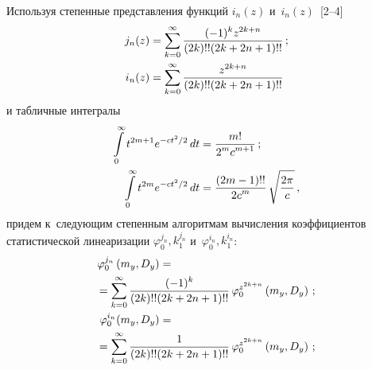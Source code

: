 \begin{multicols}{2}
Используя степенные представления функций $i_n (z)$ и~$i_n (z)$~[2--4]
\begin{align*}
j_n (z) &= \sss_{k=0}^\infty \fr{(-1)^k z^{2k+n}}
    {(2k)!! (2k + 2n + 1)!!}\,; %
    \\
i_n (z)& = \sss_{k=0}^\infty \fr{ z^{2k+n}}{(2k)!! (2k + 2n + 1)!!} %
    \end{align*}
и табличные интегралы
    \begin{align*}
       \displaystyle \int\limits_0^\infty t^{2m+1} e^{-ct^2/2}\, dt &= 
       \displaystyle\frac{\displaystyle m!\mathstrut}{\displaystyle 2^m c^{m+1}\mathstrut}\,; \\
 \displaystyle\int\limits_0^\infty t^{2m} e^{-ct^2/2}\, dt &=  \displaystyle\frac{\displaystyle (2m-1)!!\mathstrut}{\displaystyle 2c^m\mathstrut}\,\sqrt{\displaystyle\frac{\displaystyle 2\pi\mathstrut}{\displaystyle c\mathstrut}}\,,
    \end{align*}
придем к~следующим степенным алгоритмам вы\-чис\-ле\-ния коэффициентов 
статистической линеаризации $\varphi_0^{j_n}, k_1^{j_n}$ 
и~$\varphi_0^{i_n}, k_1^{i_n}$:
\begin{align}
\varphi_0^{j_n} \left(m_y, D_y\right) &={}\notag\\
&\hspace*{-20mm}{}= \sss_{k=0}^\infty \fr{(-1)^k}{(2k)!! (2k+2n+1)!!}\,
    \varphi_0^{z^{2k+n}} \left(m_y, D_y\right)\,;\label{e5.4-sin}\\
\varphi_0^{i_n} (m_y, D_y) &={}\notag\\ 
&\hspace*{-20mm}{}=\sss_{k=0}^\infty 
    \fr{1}{(2k)!! (2k+2n+1)!!}\, \varphi_0^{z^{2k+n}} \left(m_y, D_y\right)\,;
    \label{e5.5-sin}
\end{align}


\end{multicols}
